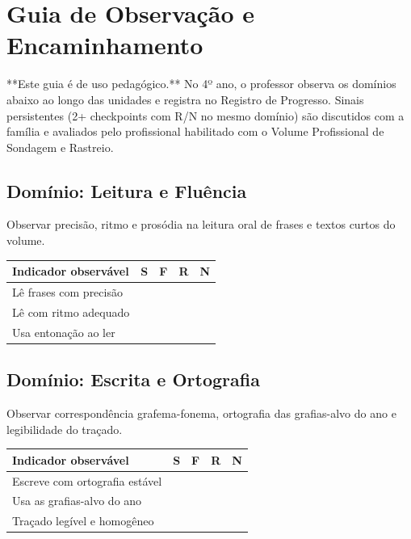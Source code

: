 
\chapter{Guia de Observação e Encaminhamento}

**Este guia é de uso pedagógico.** No 4º ano, o professor observa os domínios abaixo ao longo das unidades e registra no Registro de Progresso. Sinais persistentes (2+ checkpoints com R/N no mesmo domínio) são discutidos com a família e avaliados pelo profissional habilitado com o Volume Profissional de Sondagem e Rastreio.

\section{Domínio: Leitura e Fluência}
Observar precisão, ritmo e prosódia na leitura oral de frases e textos curtos do volume.

\begin{center}
\renewcommand{\arraystretch}{1.4}
\begin{tabular}{@{}p{9cm}cccc@{}}
\toprule
Indicador observável & S & F & R & N \\
\midrule

Lê frases com precisão & & & & \\

Lê com ritmo adequado & & & & \\

Usa entonação ao ler & & & & \\

\bottomrule\end{tabular}\end{center}

\section{Domínio: Escrita e Ortografia}
Observar correspondência grafema-fonema, ortografia das grafias-alvo do ano e legibilidade do traçado.

\begin{center}
\renewcommand{\arraystretch}{1.4}
\begin{tabular}{@{}p{9cm}cccc@{}}
\toprule
Indicador observável & S & F & R & N \\
\midrule

Escreve com ortografia estável & & & & \\

Usa as grafias-alvo do ano & & & & \\

Traçado legível e homogêneo & & & & \\

\bottomrule\end{tabular}\end{center}

